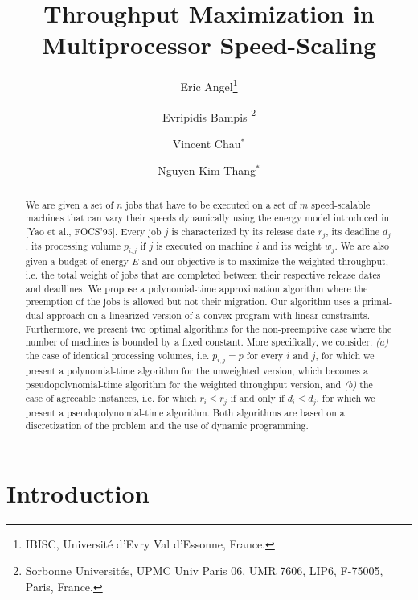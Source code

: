 \documentclass[11pt,a4paper]{article}
\begin{document}
\title{Throughput Maximization in Multiprocessor Speed-Scaling}



\author{
   Eric Angel\footnote{IBISC, Universit\'e d'Evry Val d'Essonne, France.}\\
   \and
   Evripidis Bampis
   \footnote{Sorbonne Universit\'es, UPMC Univ Paris 06, UMR 7606, LIP6, F-75005, Paris, France.}\\
   \and
   Vincent Chau$^*$\\
   \and
   Nguyen Kim Thang$^*$
}

\date{}
\maketitle
\begin{abstract}
We are given a set of $n$ jobs that have to be executed on a set of $m$ speed-scalable machines that can vary their speeds dynamically using the energy model introduced in [Yao et al., FOCS'95]. Every job $j$ is characterized by its release date $r_j$, its deadline $d_j$, its processing volume $p_{i,j}$ if $j$ is executed on machine $i$ and its weight $w_j$. We are also given a budget of energy $E$ and our objective is to maximize the weighted throughput, i.e. the total weight of jobs that are completed between their respective release dates and deadlines. We propose a polynomial-time approximation algorithm where the preemption of the jobs is allowed but not their migration. Our algorithm uses a primal-dual approach on a linearized version of a convex program with linear constraints. Furthermore, we present two optimal algorithms for the non-preemptive case where the number of machines is bounded by a fixed constant. More specifically, we consider: {\em (a)} the case of identical processing volumes, i.e. $p_{i,j}=p$ for every $i$ and $j$, for which we present a polynomial-time algorithm for the unweighted version, which becomes a pseudopolynomial-time algorithm for the weighted throughput version, and {\em (b)} the case of agreeable instances, i.e. for which $r_i \le r_j$ if and only if $d_i \le d_j$, for which we present a pseudopolynomial-time algorithm. Both algorithms are based on a discretization of the problem and the use of dynamic programming.
\end{abstract}



\section{Introduction}
\end{document}
